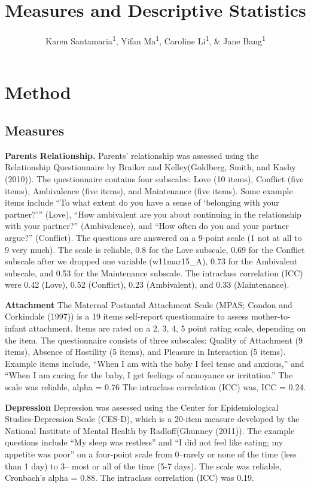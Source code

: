 \documentclass[man]{apa6}
\title{Measures and Descriptive Statistics}
\author{Karen Santamaria\textsuperscript{1}, Yifan Ma\textsuperscript{1}, Caroline Li\textsuperscript{1}, \& Jane Bang\textsuperscript{1}}
\date{}
\affiliation{
\vspace{0.5cm}
\textsuperscript{1} Smith College}
\begin{document}
\maketitle

\hypertarget{method}{%
\section{Method}\label{method}}

\hypertarget{measures}{%
\subsection{Measures}\label{measures}}

\textbf{Parents Relationship.}
Parents' relationship was assessed using the Relationship Questionnaire by Braiker and Kelley(Goldberg, Smith, and Kashy (2010)). The questionnaire contains four subscales: Love (10 items), Conflict (five items), Ambivalence (five items), and Maintenance (five items). Some example items include \enquote{To what extent do you have a sense of \enquote{belonging with your partner?}} (Love), \enquote{How ambivalent are you about continuing in the relationship with your partner?} (Ambivalence), and \enquote{How often do you and your partner argue?} (Conflict). The questions are answered on a 9-point scale (1 not at all to 9 very much). The scale is reliable, 0.8 for the Love subscale, 0.69 for the Conflict subscale after we dropped one variable (w11mar15\_A), 0.73 for the Ambivalent subscale, and 0.53 for the Maintenance subscale. The intraclass correlation (ICC) were 0.42 (Love), 0.52 (Conflict), 0.23 (Ambivalent), and 0.33 (Maintenance).

\textbf{Attachment}
The Maternal Postnatal Attachment Scale (MPAS; Condon and Corkindale (1997)) is a 19 items self-report questionnaire to assess mother-to-infant attachment. Items are rated on a 2, 3, 4, 5 point rating scale, depending on the item. The questionnaire consists of three subscales: Quality of Attachment (9 items), Absence of Hostility (5 items), and Pleasure in Interaction (5 items). Example items include, \enquote{When I am with the baby I feel tense and anxious,} and \enquote{When I am caring for the baby, I get feelings of annoyance or irritation.} The scale was reliable, alpha = 0.76 The intraclass correlation (ICC) was, ICC = 0.24.

\textbf{Depression}
Depression was assessed using the Center for Epidemiological Studies-Depression Scale (CES-D), which is a 20-item measure developed by the National Institute of Mental Health by Radloff(Ghunney (2011)). The example questions include \enquote{My sleep was restless} and \enquote{I did not feel like eating; my appetite was poor} on a four-point scale from 0--rarely or none of the time (less than 1 day) to 3-- most or all of the time (5-7 days). The scale was reliable, Cronbach's alpha = 0.88. The intraclass correlation (ICC) was 0.19.
\end{document}
